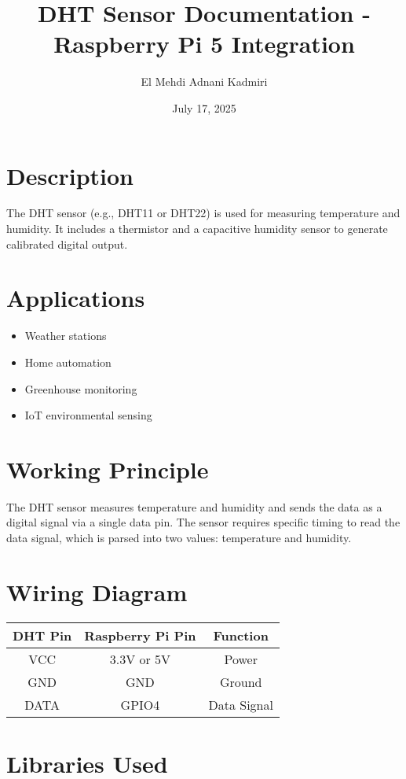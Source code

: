 \documentclass{article}
\title{DHT Sensor Documentation - Raspberry Pi 5 Integration}
\author{El Mehdi Adnani Kadmiri}
\date{July 17, 2025}
\begin{document}
	
	\maketitle
	
	\section{Description}
	The DHT sensor (e.g., DHT11 or DHT22) is used for measuring temperature and humidity. It includes a thermistor and a capacitive humidity sensor to generate calibrated digital output.
	
	\section{Applications}
	\begin{itemize}
		\item Weather stations
		\item Home automation
		\item Greenhouse monitoring
		\item IoT environmental sensing
	\end{itemize}
	
	\section{Working Principle}
	The DHT sensor measures temperature and humidity and sends the data as a digital signal via a single data pin. The sensor requires specific timing to read the data signal, which is parsed into two values: temperature and humidity.
	
	\section{Wiring Diagram}
	\begin{center}
		\begin{tabular}{|c|c|c|}
			\hline
			\textbf{DHT Pin} & \textbf{Raspberry Pi Pin} & \textbf{Function} \\
			\hline
			VCC & 3.3V or 5V & Power \\
			GND & GND & Ground \\
			DATA & GPIO4 & Data Signal \\
			\hline
		\end{tabular}
	\end{center}
	
	\section{Libraries Used}
\end{document}
